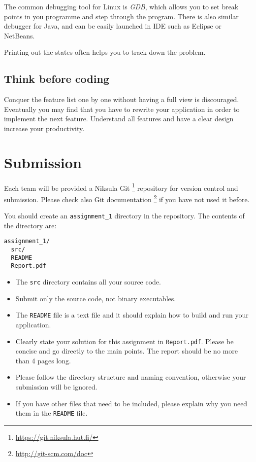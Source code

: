 \documentclass[12pt, a4paper]{article}
\begin{document}
The common debugging tool for Linux is \emph{GDB}, which allows you to set break points in you programme and step through the program.
There is also similar debugger for Java, and can be easily launched in IDE such as Eclipse or NetBeans.

Printing out the states often helps you to track down the problem.

\subsection*{Think before coding}
Conquer the feature list one by one without having a full view is discouraged.
Eventually you may find that you have to rewrite your application in order to implement the next feature.
Understand all features and have a clear design increase your productivity.


\section{Submission}
Each team will be provided a Niksula Git \footnote{\url{https://git.niksula.hut.fi/}} repository for version control and submission.
Please check also Git documentation \footnote{\url{http://git-scm.com/doc}} if you have not used it before.

You should create an \texttt{assignment\_1} directory in the repository.
The contents of the directory are:
\begin{verbatim}
assignment_1/
  src/
  README
  Report.pdf
\end{verbatim}

\begin{itemize}
\item The \texttt{src} directory contains all your source code.
\item Submit only the source code, not binary executables.
\item The \texttt{README} file is a text file and it should explain how to build and run your application.
\item Clearly state your solution for this assignment in \texttt{Report.pdf}. Please be concise and go directly to the main points. The report should be no more than 4 pages long.
\item Please follow the directory structure and naming convention, otherwise your submission will be ignored.
\item If you have other files that need to be included, please explain why you need them in the \texttt{README} file.
\end{itemize}
\end{document}
